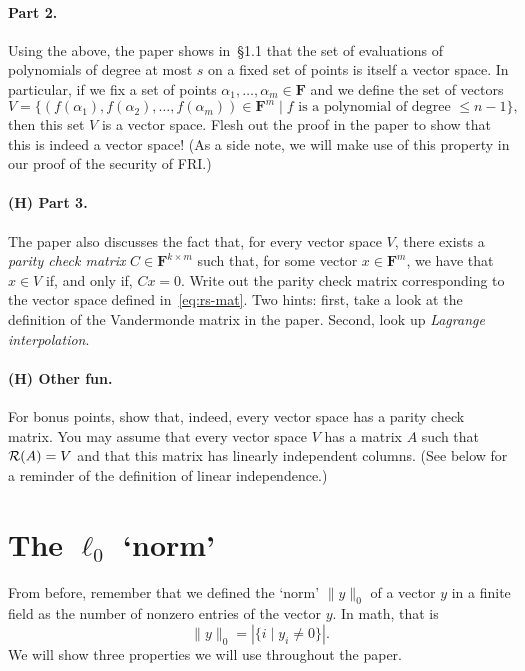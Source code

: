 \documentclass[12pt]{article}
\newcommand{\field}{\mathbf{F}}
\begin{document}
\paragraph{Part 2.} Using the above, the paper shows in~\S1.1 that the set of
evaluations of polynomials of degree at most $s$ on a fixed set of points is
itself a vector space. In particular, if we fix a set of points $\alpha_1,
\dots, \alpha_m \in \field$ and we define the set of vectors
\begin{equation}\label{eq:rs-mat}
    V = \{(f(\alpha_1), f(\alpha_2), \dots, f(\alpha_m)) \in \field^m \mid \text{$f$ is a polynomial of degree $\le n-1$}\},
\end{equation}
then this set $V$ is a vector space. Flesh out the proof in the paper to show
that this is indeed a vector space! (As a side note, we will make use of this
property in our proof of the security of FRI.)

\paragraph{(H) Part 3.} The paper also discusses the fact that, for every
vector space $V$, there exists a \emph{parity check matrix} $C \in
\field^{k\times m}$ such that, for some vector $x \in \field^m$, we have that
$x \in V$ if, and only if, $Cx = 0$. Write out the parity check matrix
corresponding to the vector space defined in~\eqref{eq:rs-mat}.
Two hints: first, take a look at the definition of the Vandermonde matrix
in the paper. Second, look up \emph{Lagrange interpolation}.

\paragraph{(H) Other fun.} For bonus points, show that, indeed, every vector space
has a parity check matrix. You may assume that every vector space $V$ has a
matrix $A$ such that ${\mathcal R}(A) = V$ and that this matrix has linearly
independent columns. (See below for a reminder of the definition of linear
independence.)

\section{The $\ell_0$ `norm'}
From before, remember that we defined the `norm' $\|y\|_0$ of a vector $y$ in a
finite field as the number of nonzero entries of the vector $y$. In math,
that is
\[
    \|y\|_0 = |\{i\mid y_i \ne 0\}|.
\]
We will show three properties we will use throughout the paper.
\end{document}
